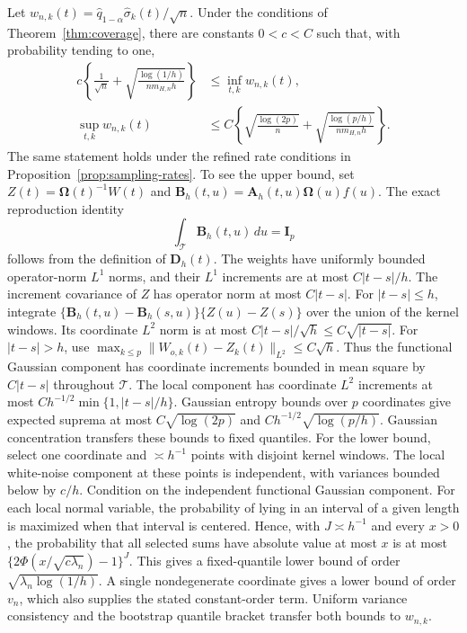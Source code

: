 \documentclass[12pt]{article}
\newcommand{\bA}{{\mathbf A}}
\newcommand{\bB}{{\mathbf B}}
\newcommand{\bD}{{\mathbf D}}
\newcommand{\bI}{{\mathbf I}}
\newcommand{\bOmega} {\boldsymbol{\Omega}}
\newcommand{\wh}{\widehat}
\numberwithin{equation}{section}
\begin{document}
Let $w_{n,k}(t)=\wh q_{1-\alpha}\wh\sigma_k(t)/\sqrt n$.
Under the conditions of Theorem~\ref{thm:coverage}, there are constants
$0<c<C$ such that, with probability tending to one,
\begin{equation*}
\begin{split}
c\left\{\frac1{\sqrt n}+
\sqrt{\frac{\log(1/h)}{nm_{H,n}h}}\right\}
&\le\inf_{t,k}w_{n,k}(t),\\
\sup_{t,k}w_{n,k}(t)
&\le C\left\{\sqrt{\frac{\log(2p)}n}+
\sqrt{\frac{\log(p/h)}{nm_{H,n}h}}\right\}.
\end{split}
\end{equation*}
The same statement holds under the refined rate conditions in
Proposition~\ref{prop:sampling-rates}.
To see the upper bound, set $Z(t)=\bOmega(t)^{-1}W(t)$ and
$\bB_h(t,u)=\bA_h(t,u)\bOmega(u)f(u)$. The exact reproduction identity
\[
\int_{\mathcal T}\bB_h(t,u)\,du=\bI_p
\]
follows from the definition of $\bD_h(t)$. The weights have uniformly
bounded operator-norm $L^1$ norms, and their $L^1$ increments are at
most $C|t-s|/h$. The increment covariance of $Z$ has operator norm at most $C|t-s|$. For $|t-s|\le h$, integrate
$\{\bB_h(t,u)-\bB_h(s,u)\}\{Z(u)-Z(s)\}$ over the union of the
kernel windows. Its coordinate $L^2$ norm is at most
$C|t-s|/\sqrt h\le C\sqrt{|t-s|}$.
For $|t-s|>h$, use
$\max_{k\le p}\|W_{o,k}(t)-Z_k(t)\|_{L^2}\le C\sqrt h$.
Thus the functional Gaussian component has coordinate increments
bounded in mean square by $C|t-s|$ throughout $\mathcal T$.
The local component has coordinate $L^2$ increments at most
$Ch^{-1/2}\min\{1,|t-s|/h\}$.
Gaussian entropy bounds over $p$ coordinates give expected suprema at most
$C\sqrt{\log(2p)}$ and $Ch^{-1/2}\sqrt{\log(p/h)}$.
Gaussian concentration transfers these bounds to fixed quantiles.
For the lower bound, select one coordinate and $\asymp h^{-1}$ points
with disjoint kernel windows. The local white-noise component at these
points is independent, with variances bounded below by $c/h$.
Condition on the independent functional Gaussian component. For each local
normal variable, the probability of lying in an interval of a given length
is maximized when that interval is centered. Hence, with $J\asymp h^{-1}$
and every $x>0$, the probability that all selected sums have absolute value
at most $x$ is at most
$\{2\Phi(x/\sqrt{c\lambda_n})-1\}^{J}$.
This gives a fixed-quantile lower bound of order
$\sqrt{\lambda_n\log(1/h)}$. A single nondegenerate coordinate gives
a lower bound of order $v_n$, which also supplies the stated
constant-order term.
Uniform variance consistency and the bootstrap quantile bracket transfer
both bounds to $w_{n,k}$.
\end{document}
